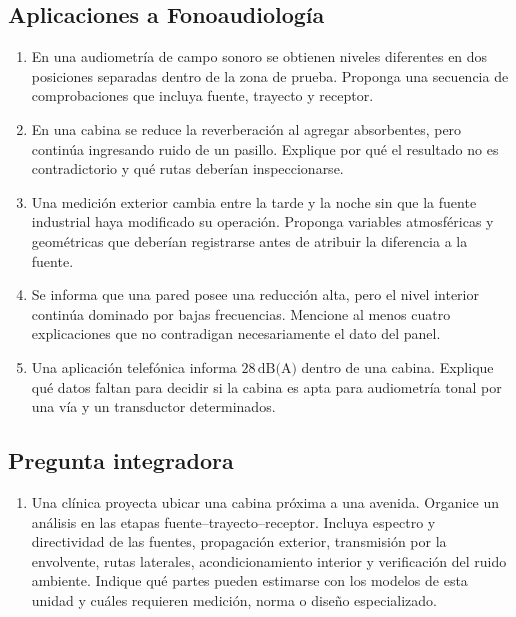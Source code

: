 \subsection*{Aplicaciones a Fonoaudiología}

\begin{enumerate}[label=\textbf{F\arabic*.},leftmargin=*]
    \item En una audiometría de campo sonoro se obtienen niveles diferentes en
    dos posiciones separadas dentro de la zona de prueba. Proponga una
    secuencia de comprobaciones que incluya fuente, trayecto y receptor.

    \item En una cabina se reduce la reverberación al agregar absorbentes, pero
    continúa ingresando ruido de un pasillo. Explique por qué el resultado no
    es contradictorio y qué rutas deberían inspeccionarse.

    \item Una medición exterior cambia entre la tarde y la noche sin que la
    fuente industrial haya modificado su operación. Proponga variables
    atmosféricas y geométricas que deberían registrarse antes de atribuir la
    diferencia a la fuente.

    \item Se informa que una pared posee una reducción alta, pero el nivel
    interior continúa dominado por bajas frecuencias. Mencione al menos cuatro
    explicaciones que no contradigan necesariamente el dato del panel.

    \item Una aplicación telefónica informa \(28\,\text{dB(A)}\) dentro de una
    cabina. Explique qué datos faltan para decidir si la cabina es apta para
    audiometría tonal por una vía y un transductor determinados.
\end{enumerate}

\subsection*{Pregunta integradora}

\begin{enumerate}[label=\textbf{I\arabic*.},leftmargin=*]
    \item Una clínica proyecta ubicar una cabina próxima a una avenida. Organice
    un análisis en las etapas fuente--trayecto--receptor. Incluya espectro y
    directividad de las fuentes, propagación exterior, transmisión por la
    envolvente, rutas laterales, acondicionamiento interior y verificación del
    ruido ambiente. Indique qué partes pueden estimarse con los modelos de esta
    unidad y cuáles requieren medición, norma o diseño especializado.
\end{enumerate}

